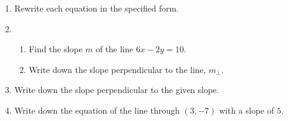 \documentclass[12pt, twoside]{article}
\begin{document}
\begin{enumerate}
\item Rewrite each equation in the specified form.
  \begin{enumerate}
  \end{enumerate} \vspace{0.5cm}

\newpage
\item   
 \begin{enumerate}
  \item Find the slope $m$ of the line $6x-2y=10$.
  \vspace{2cm}
  \item Write down the slope perpendicular to the line, $m_{\perp}$.
  \vspace{0.5cm}
\end{enumerate}

\item Write down the slope perpendicular to the given slope.
\begin{enumerate}
\end{enumerate} \vspace{0.5cm}

\item Write down the equation of the line through $(3,-7)$ with a slope of $5$.
\vspace{2cm}


\end{enumerate}
\end{document}
